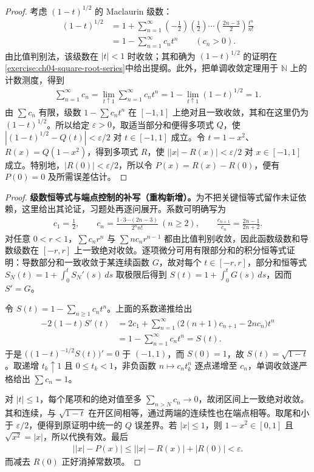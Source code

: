 \documentclass[../../main.tex]{subfiles}%
\begin{document}
\begin{proof}
考虑 $(1-t)^{1/2}$ 的 Maclaurin 级数：
\begin{align*}
(1-t)^{1/2}
&=1+\sum_{n=1}^{\infty}\left(-\frac12\right)\left(\frac12\right)\cdots\left(\frac{2n-3}{2}\right)\frac{t^n}{n!}\\
&=1-\sum_{n=1}^{\infty}c_nt^n\qquad(c_n>0).
\end{align*}
由比值判别法，该级数在 $|t|<1$ 时收敛；其和确为 $(1-t)^{1/2}$ 的证明在\cref{exercise:ch04-square-root-series}中给出提纲。此外，把单调收敛定理用于 $\mathbb N$ 上的计数测度，得到
\begin{align*}
\sum_{n=1}^{\infty}c_n
=\lim_{t\uparrow1}\sum_{n=1}^{\infty}c_nt^n
=1-\lim_{t\uparrow1}(1-t)^{1/2}=1.
\end{align*}
由 $\sum c_n$ 有限，级数 $1-\sum c_nt^n$ 在 $[-1,1]$ 上绝对且一致收敛，其和在这里仍为 $(1-t)^{1/2}$。所以给定 $\varepsilon>0$，取适当部分和便得多项式 $Q$，使 $|(1-t)^{1/2}-Q(t)|<\varepsilon/2$ 对 $t\in[-1,1]$ 成立。令 $t=1-x^2$、$R(x)=Q(1-x^2)$，得到多项式 $R$，使 $\bigl||x|-R(x)\bigr|<\varepsilon/2$ 对 $x\in[-1,1]$ 成立。特别地，$|R(0)|<\varepsilon/2$，所以令 $P(x)=R(x)-R(0)$，便有 $P(0)=0$ 及所需误差估计。
\end{proof}
\begin{proof}
\textbf{级数恒等式与端点控制的补写（重构新增）。}为不把关键恒等式留作未证依赖，这里给出其论证，习题处再逐问展开。系数可明确写为
\begin{align*}
c_1=\frac12,\qquad
c_n=\frac{1\cdot3\cdots(2n-3)}{2^n n!}\ (n\ge2),\qquad
\frac{c_{n+1}}{c_n}=\frac{2n-1}{2n+2}.
\end{align*}
对任意 $0<r<1$，$\sum c_nr^n$ 与 $\sum nc_nr^{n-1}$ 都由比值判别收敛，因此函数级数和导数级数在 $[-r,r]$ 上一致绝对收敛。逐项微分可用有限部分和的积分恒等式证明：导数部分和一致收敛于某连续函数 $G$，故对每个 $t\in[-r,r]$，部分和恒等式 $S_N(t)=1+\int_0^tS_N'(s)\,ds$ 取极限后得到 $S(t)=1+\int_0^tG(s)\,ds$，因而 $S'=G$。

令 $S(t)=1-\sum_{n\ge1}c_nt^n$。上面的系数递推给出
\begin{align*}
-2(1-t)S'(t)
&=2c_1+\sum_{n=1}^{\infty}\bigl(2(n+1)c_{n+1}-2nc_n\bigr)t^n\\
&=1-\sum_{n=1}^{\infty}c_nt^n=S(t).
\end{align*}
于是 $\bigl((1-t)^{-1/2}S(t)\bigr)'=0$ 于 $(-1,1)$，而 $S(0)=1$，故 $S(t)=\sqrt{1-t}$。取递增 $t_k\uparrow1$ 且 $0\le t_k<1$，非负函数 $n\mapsto c_nt_k^n$ 逐点递增至 $c_n$，单调收敛遂严格给出 $\sum c_n=1$。

对 $|t|\le1$，每个尾项和的绝对值至多 $\sum_{n>N}c_n\to0$，故闭区间上一致绝对收敛。其和连续，与 $\sqrt{1-t}$ 在开区间相等，通过两端的连续性也在端点相等。取尾和小于 $\varepsilon/2$，便得到原证明中统一的 $Q$ 误差界。若 $|x|\le1$，则 $1-x^2\in[0,1]$ 且 $\sqrt{x^2}=|x|$，所以代换有效。最后
\begin{align*}
\bigl||x|-P(x)\bigr|
\le\bigl||x|-R(x)\bigr|+|R(0)|<\varepsilon.
\end{align*}
而减去 $R(0)$ 正好消掉常数项。
\end{proof}
\end{document}

